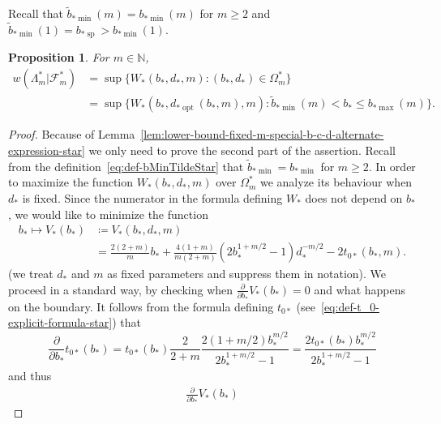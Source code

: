\documentclass[a4paper]{amsart} %
\newtheorem{proposition}[theorem]{Proposition} %
\theoremstyle{definition}
\theoremstyle{remark}
\numberwithin{equation}{section}
\newcommand*{\NNone}{\mathbb{N}}
\newcommand*{\weakconstrestricted}[2]{w(#1|#2)} %
\newcommand*{\fclassspecStar}[1]{\mathcal{F}_{#1}^*}
\newcommand*{\bStar}{b_*}
\newcommand*{\dStar}{d_*}
\newcommand*{\tZeroStar}{t_{0*}}
\newcommand*{\specialbdStar}[1]{\Omega_{#1}^*}
\newcommand*{\XXXspecialbdStar}{W_*}
\newcommand*{\XXXspecialbdDenominatorStar}{V_*}
\newcommand*{\bMinStar}{b_{*\!\min}}
\newcommand*{\bMaxStar}{b_{*\!\max}}
\newcommand*{\dOptStar}{d_{*\!\operatorname{opt}}}
\newcommand*{\bShStar}{b_{*\!\operatorname{sp}}}
\newcommand*{\bMinTildeStar}{\widetilde{b}_{*\!\min}}
\begin{document}
Recall 
that $\bMinTildeStar(m)=\bMinStar(m)$ for $m\geq 2$
and $\bMinTildeStar(1)=\bShStar > \bMinStar(1)$.

\begin{proposition}
	\label{prop:lower-bound-fixed-m-special-b-c-d-star}
	For $m\in\NNone$, 
	\begin{align*}
	\weakconstrestricted{\Lambda_m^*}{\fclassspecStar{m}} 	
	&= 
	\sup\bigl\{
	\XXXspecialbdStar(\bStar,\dStar,m) : (\bStar,\dStar)\in\specialbdStar{m} \bigr\}\\
	&=
	\sup\bigl\{
	\XXXspecialbdStar(\bStar,\dOptStar(\bStar,m),m) : \bMinTildeStar(m) < \bStar \leq \bMaxStar(m) \bigr\}.
	\end{align*}
\end{proposition}



\begin{proof}
	Because of Lemma~\ref{lem:lower-bound-fixed-m-special-b-c-d-alternate-expression-star}
	we only need to prove the second part of the assertion.
	Recall from the definition~\eqref{eq:def-bMinTildeStar}
	that $\bMinTildeStar = \bMinStar$ for $m\geq 2$.
	In order to maximize the function $\XXXspecialbdStar(\bStar,\dStar,m)$
	over $\specialbdStar{m}$
	we analyze its behaviour when $\dStar$ is fixed.
	Since the numerator in the formula defining $\XXXspecialbdStar$ does not depend on $\bStar$,
	we would like to  minimize the function 
	\begin{align*}
	\bStar \mapsto \XXXspecialbdDenominatorStar(\bStar) &\coloneqq
	\XXXspecialbdDenominatorStar(\bStar,\dStar, m) \\
	& = \frac{2(2+m)}{m}\bStar +
	\frac{4(1+m)}{m(2+m)}(2\bStar^{1+m/2}  -1)\dStar^{-m/2} 
	- 2\tZeroStar(\bStar,m).
	\end{align*}
	(we treat $\dStar$ and $m$ as fixed parameters and suppress them in notation).
	We proceed in a standard way, by checking when $\frac{\partial }{\partial \bStar} \XXXspecialbdDenominatorStar(\bStar) = 0$ and what happens on the boundary.
	It follows from the formula defining $\tZeroStar$ (see~\eqref{eq:def-t_0-explicit-formula-star}) that
	\begin{equation*}
	\frac{\partial }{\partial \bStar}\tZeroStar(\bStar)
	= \tZeroStar(\bStar) \frac{2}{2+m} \frac{2(1+m/2) \bStar^{m/2}}{2 \bStar^{1+m/2} -1}
	=  \frac{2 \tZeroStar(\bStar)\bStar^{m/2}}{2 \bStar^{1+m/2} -1}
	\end{equation*}
	and thus
	\begin{align*}
	\frac{\partial }{\partial \bStar} \XXXspecialbdDenominatorStar(\bStar)

\end{align*}
\end{proof}
\end{document}
